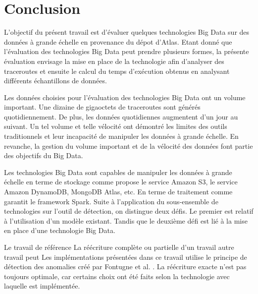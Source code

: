 \chapter*{Conclusion}


L'objectif du présent travail est d'évaluer quelques technologies Big Data sur des données à grande échelle en provenance du dépot d'Atlas. Etant donné que l'évaluation des technologies Big Data peut prendre plusieurs formes, la présente évaluation envisage 
 la mise en place de la technologie afin d'analyser  des traceroutes et ensuite  le calcul du temps d'exécution obtenus en analysant différents échantillons de données.





Les données choisies pour l'évaluation des technologies Big Data ont un volume important.  Une dizaine de gigaoctets de traceroutes sont générés quotidiennement. De plus, les données quotidiennes augmentent d'un jour au suivant. Un tel volume et telle vélocité  
ont démontré  les limites des outils traditionnels et leur incapacité de  manipuler les données à grande échelle.
En revanche, la gestion du volume important et de la vélocité des données  font partie des objectifs du Big Data.
 


Les technologies Big Data sont capables de manipuler les données à grande échelle en terme de stockage comme propose le service Amazon S3, le service Amazon DynamoDB, MongoDB Atlas, etc. En terme de traitement comme garantit le framework Spark. 
Suite à l'application  du sous-ensemble de technologies sur l'outil de détection, on distingue deux défis. Le premier est relatif à l'utilisation d'un modèle existant. Tandis que le deuxième défi est lié à la mise en place d'une technologie Big Data.

Le travail de référence 
 La réécriture complète ou partielle d'un travail autre travail peut 
Les implémentations présentées dans ce travail utilise le principe de détection des anomalies créé par Fontugne et al. \cite{DBLP:journals/corr/FontugneAPB16}. La réécriture exacte n'est pas toujours optimale, car certains choix ont été faits selon la technologie avec laquelle est implémentée. 


